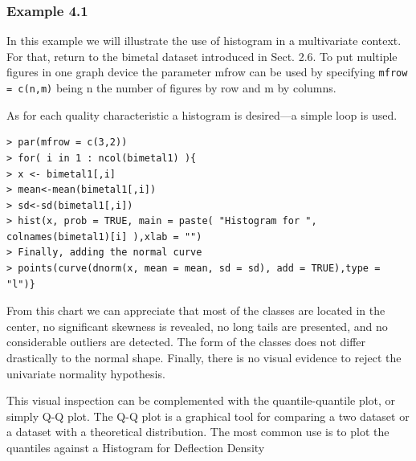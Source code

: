 \documentclass[]{beamer}
\begin{document}
\subsubsection{Example 4.1}
\begin{frame}
In this example we will illustrate the use of histogram in a multivariate context. For
that, return to the bimetal dataset introduced in Sect. 2.6.
To put multiple figures in one graph device the parameter mfrow can be used by
specifying \texttt{mfrow = c(n,m)} being n the number of figures by row and m by columns.

As for each quality characteristic a histogram is desired—a simple loop is used.
\end{frame}
\begin{frame}[fragile]
\begin{verbatim}
> par(mfrow = c(3,2))
> for( i in 1 : ncol(bimetal1) ){
> x <- bimetal1[,i]
> mean<-mean(bimetal1[,i])
> sd<-sd(bimetal1[,i])
> hist(x, prob = TRUE, main = paste( "Histogram for ", colnames(bimetal1)[i] ),xlab = "")
> Finally, adding the normal curve
> points(curve(dnorm(x, mean = mean, sd = sd), add = TRUE),type = "l")}
\end{verbatim}
\end{frame}
\begin{frame}[fragile]
From this chart we can appreciate that most of the classes are located in the center,
no significant skewness is revealed, no long tails are presented, and no considerable
outliers are detected. The form of the classes does not differ drastically to the normal
shape. Finally, there is no visual evidence to reject the univariate normality hypothesis.
\end{frame}
\begin{frame}[fragile]
This visual inspection can be complemented with the quantile-quantile plot, or simply Q-Q plot. The Q-Q plot is a graphical tool for comparing a two dataset or a dataset with a
theoretical distribution. The most common use is to plot the quantiles against a Histogram for Deflection Density
\end{frame}
\end{document}
